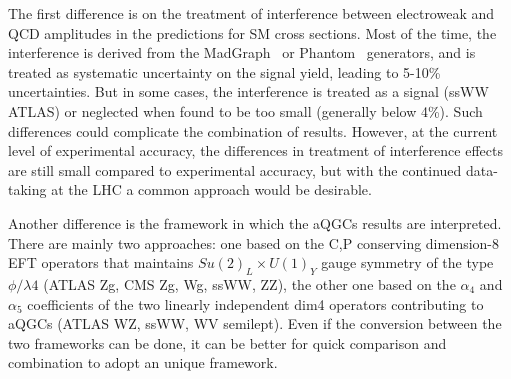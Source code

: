 

The first difference is on the treatment of interference between electroweak and QCD amplitudes in the predictions for SM cross sections. Most of the time, the interference is derived from the MadGraph~\cite{Alwall:2007fs} or Phantom~\cite{Ballestrero:2007xq} generators, and is treated as systematic uncertainty on the signal yield, leading to 5-10\% uncertainties. But in some cases, the interference is treated as a signal (ssWW ATLAS) or neglected when found to be too small (generally below 4\%). Such differences could complicate the combination of results.
However, at the current level of experimental accuracy, the differences in treatment of interference effects are still small compared to experimental accuracy, but with the continued data-taking at the LHC a common approach would be desirable.

Another difference is the framework in which the aQGCs results are interpreted. There are mainly two approaches: one based on the C,P conserving dimension-8 EFT operators that maintains $Su(2)_L \times U(1)_Y$ gauge symmetry of the type $\phi/\lambda{}4$ (ATLAS Zg, CMS Zg, Wg, ssWW, ZZ), the other one based on the $\alpha_4$ and $\alpha_5$ coefficients of the two linearly independent dim4 operators contributing to aQGCs (ATLAS WZ, ssWW, WV semilept). Even if the conversion between the two frameworks can be done, it can be better for quick comparison and combination to adopt an unique framework.

